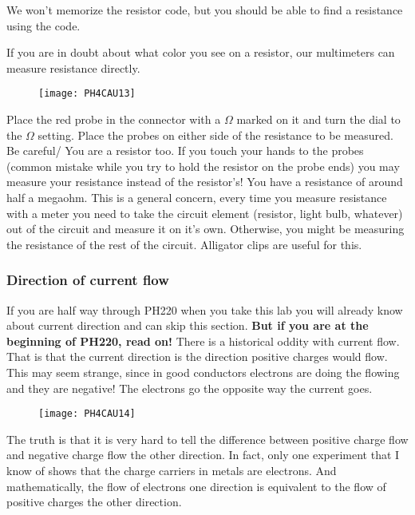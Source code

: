 We won't memorize the resistor code, but you should be able to find a resistance using the code.

If you are in doubt about what color you see on a resistor, our multimeters can measure resistance directly. 

\begin{figure}[h!]
	\centering
    \texttt{[image: PH4CAU13]}
\end{figure}

Place the red probe in the connector with a $\Omega $ marked on it and turn the dial to the $\Omega$ setting. Place the probes on either side of the resistance to be measured. Be careful/ You are a resistor too. If you touch your hands to the probes (common mistake while you try to hold the resistor on the probe ends) you may measure your resistance instead of the resistor's! You have a resistance of around half a megaohm. This is a general concern, every time you measure resistance with a meter you need to take the circuit element (resistor, light bulb, whatever) out of the circuit and measure it on it's own. Otherwise, you might be measuring the resistance of the rest of the circuit. Alligator clips are useful for this.

\subsubsection{Direction of current flow}

If you are half way through PH220 when you take this lab you will already know about current direction and can skip this section. \textbf{But if you are at the beginning of PH220, read on!} There is a historical oddity with current flow. That is that the current direction is the direction positive charges would flow. This may seem strange, since in good conductors electrons are doing the flowing and they are negative! The electrons go the opposite way the current goes. 

\begin{figure}[h!]
	\centering
     \texttt{[image: PH4CAU14]}
\end{figure}

The truth is that it is very hard to tell the difference between positive charge flow and negative charge flow the other direction. In fact, only one experiment that I know of shows that the charge carriers in metals are electrons. And mathematically, the flow of electrons one direction is equivalent to the flow of positive charges the other direction.


